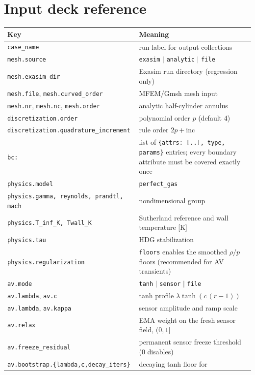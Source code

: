 \documentclass[11pt]{article}
\newcommand{\code}[1]{\texttt{#1}}
\begin{document}
\section{Input deck reference}

\begin{center}
\begin{longtable}{p{}p{}}
\toprule
Key & Meaning \\
\midrule
\code{case\_name} & run label for output collections \\
\midrule
\code{mesh.source} & \code{exasim} $|$ \code{analytic} $|$ \code{file} \\
\code{mesh.exasim\_dir} & Exasim run directory (regression only) \\
\code{mesh.file}, \code{mesh.curved\_order} & MFEM/Gmsh mesh input \\
\code{mesh.nr}, \code{mesh.nc}, \code{mesh.order} & analytic
   half-cylinder annulus \\
\midrule
\code{discretization.order} & polynomial order $p$ (default 4) \\
\code{discretization.quadrature\_increment} & rule order $2p+{}$inc \\
\midrule
\code{bc:} & list of \code{\{attrs: [..], type, params\}} entries;
   every boundary attribute must be covered exactly once \\
\midrule
\code{physics.model} & \code{perfect\_gas} \\
\code{physics.gamma, reynolds, prandtl, mach} & nondimensional group \\
\code{physics.T\_inf\_K, Twall\_K} & Sutherland reference and wall
   temperature [K] \\
\code{physics.tau} & HDG stabilization \\
\code{physics.regularization} & \code{floors} enables the smoothed
   $\rho/p$ floors (recommended for AV transients) \\
\midrule
\code{av.mode} & \code{tanh} $|$ \code{sensor} $|$ \code{file} \\
\code{av.lambda}, \code{av.c} & tanh profile
   $\lambda \tanh(c\,(r-1))$ \\
\code{av.lambda}, \code{av.kappa} & sensor amplitude and ramp scale \\
\code{av.relax} & EMA weight on the fresh sensor field, $(0,1]$ \\
\code{av.freeze\_residual} & permanent sensor freeze threshold
   (0 disables) \\
\code{av.bootstrap.\{lambda,c,decay\_iters\}} & decaying tanh floor for

\end{longtable}
\end{center}
\end{document}
